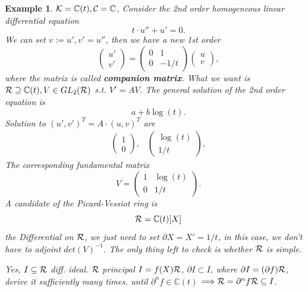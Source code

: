 \documentclass[11pt]{article}
\newtheorem{ex}[thm]{Example}
\newcommand{\pd}{\partial}
\newcommand{\cplx}{\mathbb C}
\newcommand{\calc}{{\cal C}}
\newcommand{\calk}{{\cal K}}
\newcommand{\calr}{{\cal R}}
\newcommand{\Lrta}{\Longrightarrow}
\begin{document}
\begin{ex}
$\calk=\cplx(t), \calc=\cplx$, Consider the 2nd order homogeneous linear differential equation
$$
t\cdot u''+u'=0.
$$
We can set $v:=u', v'=u''$, then we have a new 1st order 
$$
\begin{pmatrix}
u'\\
v'
\end{pmatrix} =\begin{pmatrix}
0 & 1\\
0 & -1/t
\end{pmatrix}\begin{pmatrix}
u\\
v
\end{pmatrix},
$$
where the matrix is called \textbf{companion matrix}.
What we want is $\calr\supseteq \cplx(t), V\in GL_2(\calr)$ s.t. $V'=AV$. The general solution of the 2nd order equation is 
$$
a+b \log(t).
$$
Solution to $(u',v')^T=A\cdot(u,v)^T$ are
$$
\begin{aligned}
\begin{pmatrix}
1\\
0
\end{pmatrix},
&
\begin{pmatrix}
\log(t)\\
1/t
\end{pmatrix},
\end{aligned}
$$
The corresponding fundamental matrix 
$$
V=\begin{pmatrix}
1 & \log(t)\\
0 & 1/t
\end{pmatrix}.
$$
A candidate of the Picard-Vessiot ring is 
$$
\calr=\cplx(t)[X]
$$
the Differential on $\calr$, we just need to set $\pd X=X'=1/t$, in this case, we don't have to adjoint $det(V)^{-1}$. The only thing left to check is whether $\calr$ is simple.

Yes, $I\subseteq \calr$ diff. ideal. $\calr$ principal $I=f(X)\calr$,  $\pd I\subset I$, where $\pd I=(\pd f)\calr$, derive it sufficiently many times. until $\pd^n f\in \cplx(t)$ $\Lrta \calr=\pd^n f\calr \subseteq I$.  
\end{ex}
\end{document}
